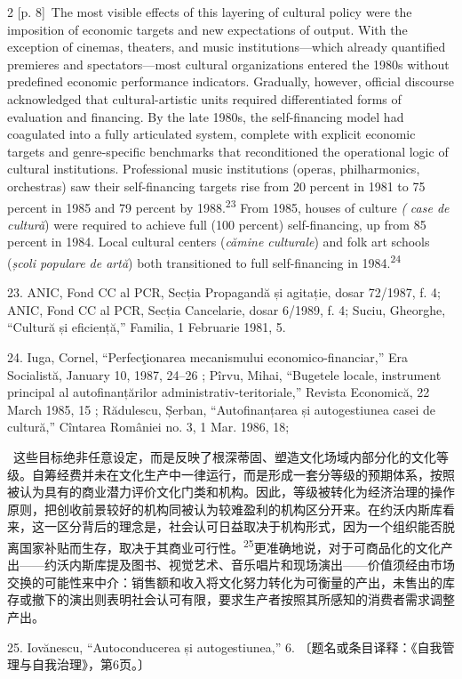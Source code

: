 \documentclass[10pt,a4paper]{article}
\begin{document}
\begin{paracol}{2}
{\scriptsize\color{gray} [p. 8]}\ The most visible effects of this layering of cultural policy were the imposition of economic targets and new expectations of output. With the exception of cinemas, theaters, and music institutions—which already quantified premieres and spectators—most cultural organizations entered the 1980s without predefined economic performance indicators. Gradually, however, official discourse acknowledged that cultural-artistic units required differentiated forms of evaluation and financing. By the late 1980s, the self-financing model had coagulated into a fully articulated system, complete with explicit economic targets and genre-specific benchmarks that reconditioned the operational logic of cultural institutions. Professional music institutions (operas, philharmonics, orchestras) saw their self-financing targets rise from 20 percent in 1981 to 75 percent in 1985 and 79 percent by 1988.\nobreak\textsuperscript{23} From 1985, houses of culture \textit{(} \textit{case de cultură}) were required to achieve full (100 percent) self-financing, up from 85 percent in 1984. Local cultural centers (\textit{cămine culturale}) and folk art schools (\textit{școli populare de artă}) both transitioned to full self-financing in 1984.\nobreak\textsuperscript{24}\par{\small 23. ANIC, Fond CC al PCR, Secția Propagandă și agitație, dosar 72/1987, f. 4; ANIC, Fond CC al PCR, Secția Cancelarie, dosar 6/1989, f. 4; Suciu, Gheorghe, “Cultură și eficiență,” Familia, 1 Februarie 1981, 5.\par}{\small 24. Iuga, Cornel, “Perfecţionarea mecanismului economico-financiar,” Era Socialistă, January 10, 1987, 24–26 ; Pîrvu, Mihai, “Bugetele locale, instrument principal al autofinanțărilor administrativ-teritoriale,” Revista Economică, 22 March 1985, 15 ; Rădulescu, Șerban, “Autofinanțarea și autogestiunea casei de cultură,” Cîntarea României no. 3, 1 Mar. 1986, 18;\par}
\switchcolumn*
{\scriptsize\color{gray} [p. 8]}\ 这些目标绝非任意设定，而是反映了根深蒂固、塑造文化场域内部分化的文化等级。自筹经费并未在文化生产中一律运行，而是形成一套分等级的预期体系，按照被认为具有的商业潜力评价文化门类和机构。因此，等级被转化为经济治理的操作原则，把创收前景较好的机构同被认为较难盈利的机构区分开来。在约沃内斯库看来，这一区分背后的理念是，社会认可日益取决于机构形式，因为一个组织能否脱离国家补贴而生存，取决于其商业可行\mbox{性。\textsuperscript{25}}更准确地说，对于可商品化的文化产出——约沃内斯库提及图书、视觉艺术、音乐唱片和现场演出——价值须经由市场交换的可能性来中介：销售额和收入将文化努力转化为可衡量的产出，未售出的库存或撤下的演出则表明社会认可有限，要求生产者按照其所感知的消费者需求调整产出。\par{\small 25. Iovănescu, “Autoconducerea și autogestiunea,” 6. 〔题名或条目译释：《自我管理与自我治理》，第6页。〕\par}

\end{paracol}
\end{document}
